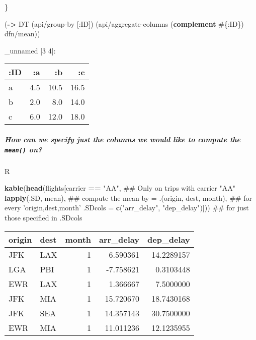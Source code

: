 \documentclass[]{article}
\newenvironment{Shaded}{\begin{snugshade}}{\end{snugshade}}
\newcommand{\KeywordTok}[1]{\textcolor[rgb]{0.13,0.29,0.53}{\textbf{#1}}}
\newcommand{\DataTypeTok}[1]{\textcolor[rgb]{0.13,0.29,0.53}{#1}}
\newcommand{\StringTok}[1]{\textcolor[rgb]{0.31,0.60,0.02}{#1}}
\newcommand{\OperatorTok}[1]{\textcolor[rgb]{0.81,0.36,0.00}{\textbf{#1}}}
\newcommand{\AttributeTok}[1]{\textcolor[rgb]{0.77,0.63,0.00}{#1}}
\newcommand{\NormalTok}[1]{#1}
\let\oldsubparagraph\subparagraph
\renewcommand{\subparagraph}[1]{\oldsubparagraph{#1}\mbox{}}
\begin{document}
\}

\begin{Shaded}
\begin{Highlighting}[]
\NormalTok{(}\KeywordTok{->}\NormalTok{ DT}
\NormalTok{    (api/group-by [}\AttributeTok{:ID}\NormalTok{])}
\NormalTok{    (api/aggregate-columns (}\KeywordTok{complement}\NormalTok{ #\{}\AttributeTok{:ID}\NormalTok{\}) dfn/mean))}
\end{Highlighting}
\end{Shaded}

\_unnamed {[}3 4{]}:

\begin{longtable}[]{@{}lrrr@{}}
\toprule
:ID & :a & :b & :c\tabularnewline
\midrule
\endhead
a & 4.5 & 10.5 & 16.5\tabularnewline
b & 2.0 & 8.0 & 14.0\tabularnewline
c & 6.0 & 12.0 & 18.0\tabularnewline
\bottomrule
\end{longtable}

\subparagraph{\texorpdfstring{How can we specify just the columns we
would like to compute the \texttt{mean()}
on?}{How can we specify just the columns we would like to compute the mean() on?}}\label{how-can-we-specify-just-the-columns-we-would-like-to-compute-the-mean-on}

R

\begin{Shaded}
\begin{Highlighting}[]
\KeywordTok{kable}\NormalTok{(}\KeywordTok{head}\NormalTok{(flights[carrier }\OperatorTok{==}\StringTok{ "AA"}\NormalTok{,                         ## Only on trips with carrier "AA"}
                   \KeywordTok{lapply}\NormalTok{(.SD, mean),                       ## compute the mean}
                   \DataTypeTok{by =}\NormalTok{ .(origin, dest, month),             ## for every 'origin,dest,month'}
                   \DataTypeTok{.SDcols =} \KeywordTok{c}\NormalTok{(}\StringTok{"arr_delay"}\NormalTok{, }\StringTok{"dep_delay"}\NormalTok{)])) ## for just those specified in .SDcols}
\end{Highlighting}
\end{Shaded}

\begin{longtable}[]{@{}llrrr@{}}
\toprule
origin & dest & month & arr\_delay & dep\_delay\tabularnewline
\midrule
\endhead
JFK & LAX & 1 & 6.590361 & 14.2289157\tabularnewline
LGA & PBI & 1 & -7.758621 & 0.3103448\tabularnewline
EWR & LAX & 1 & 1.366667 & 7.5000000\tabularnewline
JFK & MIA & 1 & 15.720670 & 18.7430168\tabularnewline
JFK & SEA & 1 & 14.357143 & 30.7500000\tabularnewline
EWR & MIA & 1 & 11.011236 & 12.1235955\tabularnewline
\bottomrule
\end{longtable}
\end{document}
